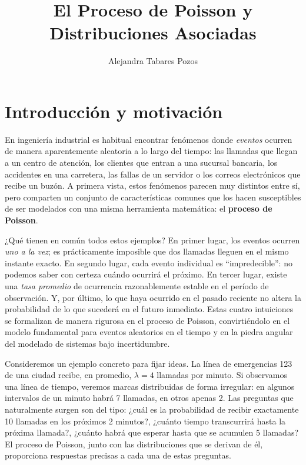 \documentclass[11pt, letterpaper]{article}
\title{El Proceso de Poisson y Distribuciones Asociadas}
\author{Alejandra Tabares Pozos}
\date{}
\begin{document}

\maketitle
\tableofcontents
\newpage

\section{Introducción y motivación}

En ingeniería industrial es habitual encontrar fenómenos donde \emph{eventos} ocurren de manera aparentemente aleatoria a lo largo del tiempo: las llamadas que llegan a un centro de atención, los clientes que entran a una sucursal bancaria, los accidentes en una carretera, las fallas de un servidor o los correos electrónicos que recibe un buzón. A primera vista, estos fenómenos parecen muy distintos entre sí, pero comparten un conjunto de características comunes que los hacen susceptibles de ser modelados con una misma herramienta matemática: el \textbf{proceso de Poisson}.

¿Qué tienen en común todos estos ejemplos? En primer lugar, los eventos ocurren \emph{uno a la vez}; es prácticamente imposible que dos llamadas lleguen en el mismo instante exacto. En segundo lugar, cada evento individual es ``impredecible'': no podemos saber con certeza cuándo ocurrirá el próximo. En tercer lugar, existe una \emph{tasa promedio} de ocurrencia razonablemente estable en el período de observación. Y, por último, lo que haya ocurrido en el pasado reciente no altera la probabilidad de lo que sucederá en el futuro inmediato. Estas cuatro intuiciones se formalizan de manera rigurosa en el proceso de Poisson, convirtiéndolo en el modelo fundamental para eventos aleatorios en el tiempo y en la piedra angular del modelado de sistemas bajo incertidumbre.

Consideremos un ejemplo concreto para fijar ideas. La línea de emergencias 123 de una ciudad recibe, en promedio, $\lambda = 4$ llamadas por minuto. Si observamos una línea de tiempo, veremos marcas distribuidas de forma irregular: en algunos intervalos de un minuto habrá 7 llamadas, en otros apenas 2. Las preguntas que naturalmente surgen son del tipo: ¿cuál es la probabilidad de recibir exactamente 10 llamadas en los próximos 2 minutos?, ¿cuánto tiempo transcurrirá hasta la próxima llamada?, ¿cuánto habrá que esperar hasta que se acumulen 5 llamadas? El proceso de Poisson, junto con las distribuciones que se derivan de él, proporciona respuestas precisas a cada una de estas preguntas.
\end{document}
